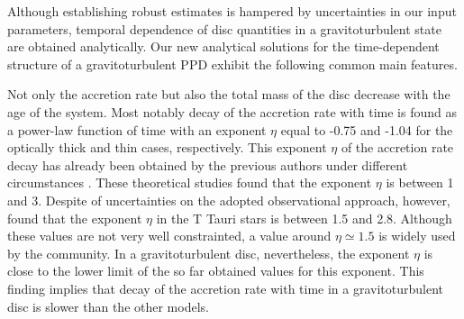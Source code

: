 \documentclass[apj]{emulateapj}
\begin{document}
 Although establishing robust estimates is hampered by uncertainties in our input parameters, temporal dependence of disc quantities in a gravitoturbulent state are obtained analytically.  Our new analytical solutions for the time-dependent structure of a gravitoturbulent PPD exhibit the following common main features.
 
Not only the accretion rate but also the total mass of the disc decrease with the age of the system. Most notably decay of the accretion rate with time is found as a power-law function of time with an exponent $\eta$ equal to -0.75 and -1.04 for the  optically thick and thin cases, respectively. This exponent $\eta$ of the accretion rate decay has already been obtained by the previous authors under different circumstances \citep[e.g.,][]{lynden74,filipov,cannizzo,king98,tanaka2011,Lipu15}. These theoretical studies found that  the exponent $\eta$ is between 1 and 3. Despite of uncertainties on the adopted observational approach, however, \cite{hartmann98} found that the exponent $\eta$ in the T Tauri stars is between 1.5 and 2.8. Although these values are not very well constrainted, a value around $\eta\simeq 1.5$ is widely used by the community. In a gravitoturbulent disc, nevertheless, the exponent $\eta$ is close to the lower limit of the so far   obtained values for this exponent. This finding implies that decay of the accretion rate with time in a gravitoturbulent disc is slower than the other models.  
 
\end{document}
